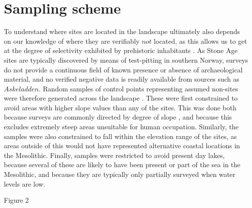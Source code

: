 \documentclass[12pt, a4paper]{article}
\begin{document}
\section{Sampling scheme}
To understand where sites are located in the landscape ultimately also depends on our knowledge of where they are verifiably $not$ located, as this allows us to get at the degree of selectivity exhibited by prehistoric inhabitants \citep[][2]{jochim1989}. As Stone Age sites are typically discovered by means of test-pitting in southern Norway, surveys do not provide a continuous field of known presence or absence of archaeological material, and no verified negative data is readily available from sources such as $Askeladden$. Random samples of control points representing assumed non-sites were therefore generated across the landscape \citep[e.g.][]{kvamme1988, fisher1997}. These were first constrained to avoid areas with higher slope values than any of the sites. This was done both because surveys are commonly directed by degree of slope \citep[e.g.][369]{nielsen2016}, and because this excludes extremely steep areas unsuitable for human occupation. Similarly, the samples were also constrained to fall within the elevation range of the sites, as areas outside of this would not have represented alternative coastal locations in the Mesolithic. Finally, samples were restricted to avoid present day lakes, because several of these are likely to have been present or part of the sea in the Mesolithic, and because they are typically only partially surveyed when water levels are low.\par   

Figure 2
  
\end{document}
